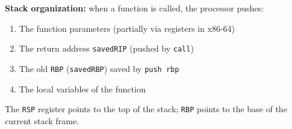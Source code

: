 \documentclass[a4paper,11pt]{article}
\theoremstyle{plain}
\theoremstyle{definition}
\begin{document}
\medskip

\begin{rappel}
\textbf{Stack organization:} when a function is called, the processor pushes:
\begin{enumerate}
    \item The function parameters (partially via registers in x86-64)
    \item The return address \texttt{savedRIP} (pushed by \texttt{call})
    \item The old \texttt{RBP} (\texttt{savedRBP}) saved by \texttt{push rbp}
    \item The local variables of the function
\end{enumerate}
The \texttt{RSP} register points to the top of the stack; \texttt{RBP} points to the base of the current stack frame.
\end{rappel}

\bigskip


\end{document}
